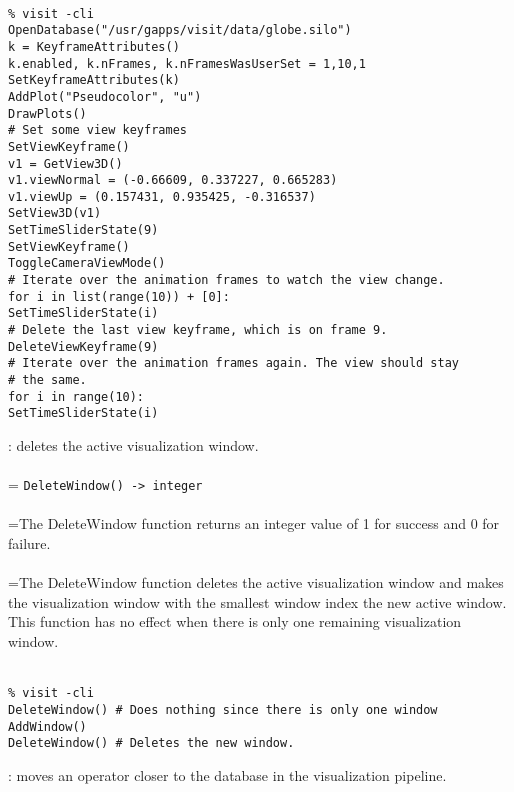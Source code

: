 \documentclass[10pt,a4paper]{report}
\begin{document}
\\[-6mm]
\begin{verbatim}% visit -cli
OpenDatabase("/usr/gapps/visit/data/globe.silo")
k = KeyframeAttributes()
k.enabled, k.nFrames, k.nFramesWasUserSet = 1,10,1
SetKeyframeAttributes(k)
AddPlot("Pseudocolor", "u")
DrawPlots()
# Set some view keyframes
SetViewKeyframe()
v1 = GetView3D()
v1.viewNormal = (-0.66609, 0.337227, 0.665283)
v1.viewUp = (0.157431, 0.935425, -0.316537)
SetView3D(v1)
SetTimeSliderState(9)
SetViewKeyframe()
ToggleCameraViewMode()
# Iterate over the animation frames to watch the view change.
for i in list(range(10)) + [0]:
SetTimeSliderState(i)
# Delete the last view keyframe, which is on frame 9.
DeleteViewKeyframe(9)
# Iterate over the animation frames again. The view should stay 
# the same.
for i in range(10):
SetTimeSliderState(i)
\end{verbatim}
\newpage


{}
: deletes the active visualization window.\\[-3mm]

 \\ 
\hangindent=\parindent 
\verb!DeleteWindow() -> integer!\\ [-3mm]

 \\ 
\hangindent=\parindent The DeleteWindow function returns an integer value of 1 for success and 0 for failure. \\[-3mm] 

 \\ 
\hangindent=\parindent The DeleteWindow function deletes the active visualization window and makes the visualization window with the smallest window index the new active window. This function has no effect when there is only one remaining visualization window. \\[-3mm] 

\\[-6mm]
\begin{verbatim}% visit -cli
DeleteWindow() # Does nothing since there is only one window
AddWindow()
DeleteWindow() # Deletes the new window.
\end{verbatim}
\newpage


{}
: moves an operator closer to the database in the visualization pipeline.\\[-3mm]
\end{document}
